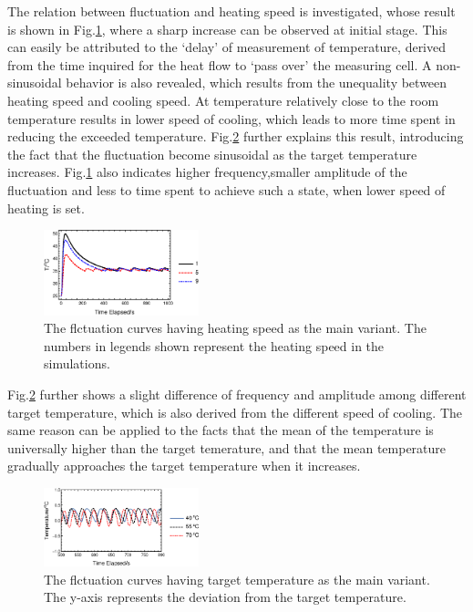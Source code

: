 \documentclass[%
 reprint,
 amsmath,amssymb,
 aps,
]{revtex4-1}
\begin{document}
The relation between fluctuation and heating speed is investigated, whose result is shown in Fig.\ref{heatspeed}, where a sharp increase can be observed at initial stage. This can easily be attributed to the `delay' of measurement of temperature, derived from the time inquired for the heat flow to `pass over' the measuring cell. A non-sinusoidal behavior is also revealed, which results from the unequality between heating speed and cooling speed. At temperature relatively close to the room temperature results in lower speed of cooling, which leads to more time spent in reducing the exceeded temperature. Fig.\ref{targettemp} further explains this result, introducing the fact that the fluctuation become sinusoidal as the target temperature increases. Fig.\ref{heatspeed} also indicates higher frequency,smaller amplitude of the fluctuation and less to time spent to achieve such a state, when lower speed of heating is set.

\begin{figure}
\centering
\includegraphics[width=0.4\textwidth]{figures/heatspeed.eps}
\caption{The flctuation curves having heating speed as the main variant. The numbers in legends shown represent the heating speed in the simulations.}
\label{heatspeed}
\end{figure}

Fig.\ref{targettemp} further shows a slight difference of frequency and amplitude among different target temperature, which is also derived from the different speed of cooling. The same reason can be applied to the facts that the mean of the temperature is universally higher than the target temerature, and that the mean temperature gradually approaches the target temperature when it increases.

\begin{figure}
\centering
\includegraphics[width=0.4\textwidth]{figures/targettemp.eps}
\caption{The flctuation curves having target temperature as the main variant. The y-axis represents the deviation from the target temperature.}
\label{targettemp}
\end{figure}
\end{document}

